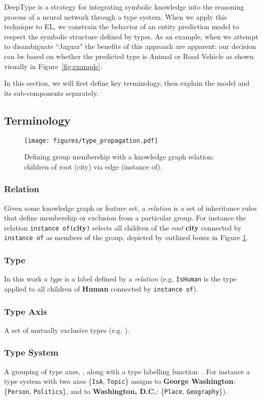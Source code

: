 \documentclass[letterpaper]{article}
\begin{document}
DeepType is a strategy for integrating symbolic knowledge into the reasoning process of a neural network through a type system. When we apply this technique to EL, we constrain the behavior of an entity prediction model to respect the symbolic structure defined by types. As an example, when we attempt to disambiguate ``Jaguar" the benefits of this approach are apparent: our decision can be based on whether the predicted type is Animal or Road Vehicle as shown visually in Figure~\ref{fig:example}.

In this section, we will first define key terminology, then explain the model and its sub-components separately.
\subsection{Terminology}

\begin{figure}[ht]
\centering
\texttt{[image: figures/type\_propagation.pdf]}
\caption{Defining group membership with a knowledge graph relation: children of root (city) via edge (instance of).}
\label{fig:propagation}
\end{figure}

\subsubsection{Relation} Given some knowledge graph or feature set, a {\em relation} is a set of inheritance rules that define membership or exclusion from a particular group. For instance the relation {\tt instance of(}{\bf city}{\tt)} selects all children of the {\em root} {\bf city} connected by {\tt instance of} as members of the group, depicted by outlined boxes in Figure \ref{fig:propagation}.

\subsubsection{Type} In this work a {\em type} is a label defined by a {\em relation} (e.g. {\tt IsHuman}  is the type applied to all children of {\bf Human} connected by {\tt instance of}).

\subsubsection{Type Axis} A set of mutually exclusive types (e.g. ).

\subsubsection{Type System} A grouping of type axes, , along with a type labelling function: . For instance a type system with two axes \{\texttt{IsA}, \texttt{Topic}\} assigns to \textbf{George Washington}: \{\texttt{Person}, \texttt{Politics}\}, and to \textbf{Washington, D.C.}: \{\texttt{Place},  \texttt{Geography}\}).
\end{document}
